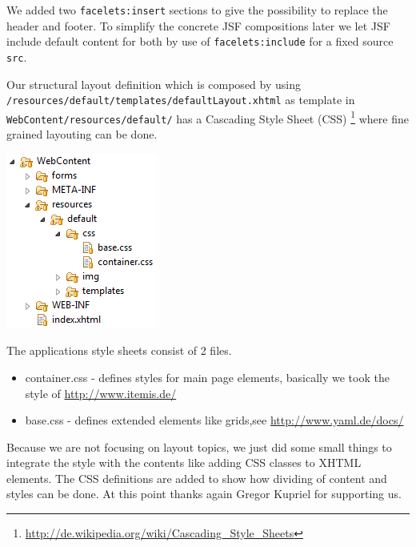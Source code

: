 We added two \texttt{facelets:insert} sections to give the possibility to
replace the header and footer. To simplify the concrete JSF compositions later we let JSF include
default content for both by use of \texttt{facelets:include} for a fixed source
\texttt{src}.

Our structural layout definition which is composed by using
\texttt{/resources/default/templates/defaultLayout.xhtml} as template in \newline
\texttt{WebContent/resources/default/} has a Cascading Style Sheet (CSS)
\footnote{\url{http://de.wikipedia.org/wiki/Cascading_Style_Sheets}} where fine
grained layouting can be done.

\includegraphics{./images/chapter02/css_template.png}

The applications style sheets consist of 2 files.

\begin{itemize}
\item container.css - defines styles for main page elements, basically we took
the style of \url{http://www.itemis.de/}
\item base.css - defines extended elements like grids,see
\url{http://www.yaml.de/docs/}
\end{itemize} 

Because we are not focusing on layout topics, we just did some small things to
integrate the style with the contents like adding CSS classes to XHTML elements.
The CSS definitions are added to show how dividing of content and styles
can be done. At this point thanks again Gregor Kupriel for supporting us.  
